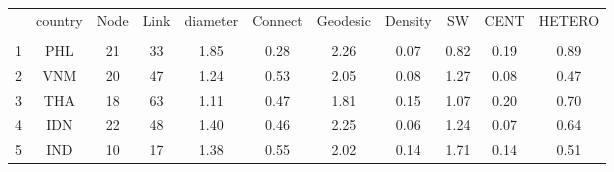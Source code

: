 \begin{table} 
    \begin{tabular}{ c c c c c c c c c c c }
        \hline & country & Node & Link & diameter & Connect & Geodesic & Density & SW & CENT & HETERO \\ 
         \\ 
        \hline1 & PHL & 21 & 33 & 1.85 & 0.28 & 2.26 & 0.07 & 0.82 & 0.19 & 0.89 \\ 
        2 & VNM & 20 & 47 & 1.24 & 0.53 & 2.05 & 0.08 & 1.27 & 0.08 & 0.47 \\ 
        3 & THA & 18 & 63 & 1.11 & 0.47 & 1.81 & 0.15 & 1.07 & 0.20 & 0.70 \\ 
        4 & IDN & 22 & 48 & 1.40 & 0.46 & 2.25 & 0.06 & 1.24 & 0.07 & 0.64 \\ 
        5 & IND & 10 & 17 & 1.38 & 0.55 & 2.02 & 0.14 & 1.71 & 0.14 & 0.51 \\ 
    \end{tabular} 
\end{table}
